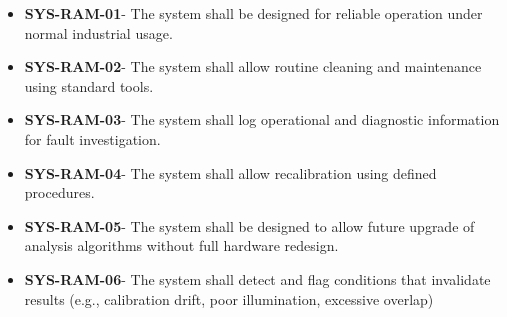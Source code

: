 \documentclass[a4paper, 12pt, english]{article}
\begin{document}
\begin{itemize}
    \item \textbf{SYS-RAM-01}- The system shall be designed for reliable operation under normal industrial usage.
    \item \textbf{SYS-RAM-02}- The system shall allow routine cleaning and maintenance using standard tools.
    \item \textbf{SYS-RAM-03}- The system shall log operational and diagnostic information for fault investigation.
    \item \textbf{SYS-RAM-04}- The system shall allow recalibration using defined procedures.
    \item \textbf{SYS-RAM-05}- The system shall be designed to allow future upgrade of analysis algorithms without full hardware redesign.
    \item \textbf{SYS-RAM-06}- The system shall detect and flag conditions that invalidate results (e.g., calibration drift, poor illumination, excessive overlap)  
\end{itemize}
\end{document}
